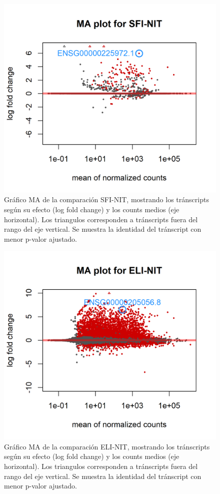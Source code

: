 \documentclass[
]{article}
\begin{document}
\begin{figure}

{\centering \includegraphics[width=0.8\linewidth]{results/4.DEAnl/3.MASvN_2} 

}

\caption{Gráfico MA de la comparación SFI-NIT, mostrando los tránscripts según su efecto (log fold change) y los counts medios (eje horizontal). Los triangulos corresponden a tránscripts fuera del rango del eje vertical. Se muestra la identidad del tránscript con menor p-valor ajustado.}\label{fig:Fig9}
\end{figure}

\begin{figure}

{\centering \includegraphics[width=0.8\linewidth]{results/4.DEAnl/4.MAEvN_2} 

}

\caption{Gráfico MA de la comparación ELI-NIT, mostrando los tránscripts según su efecto (log fold change) y los counts medios (eje horizontal). Los triangulos corresponden a tránscripts fuera del rango del eje vertical. Se muestra la identidad del tránscript con menor p-valor ajustado.}\label{fig:Fig10}
\end{figure}
\end{document}
